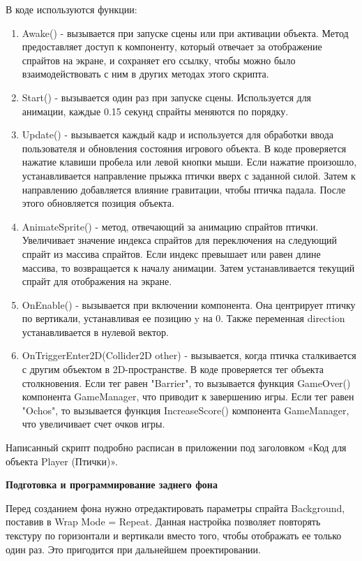 \documentclass[14pt, oneside]{altsu-report}
\begin{document}
В коде используются функции:

\begin{enumerate}
\item Awake() - вызывается при запуске сцены или при активации объекта. Метод предоставляет доступ к компоненту, который отвечает за отображение спрайтов на экране, и сохраняет его ссылку, чтобы можно было взаимодействовать с ним в других методах этого скрипта.
\item Start() - вызывается один раз при запуске сцены. Используется для анимации, каждые 0.15 секунд спрайты меняются по порядку.
\item Update() - вызывается каждый кадр и используется для обработки ввода пользователя и обновления состояния игрового объекта. В коде проверяется нажатие клавиши пробела или левой кнопки мыши. Если нажатие произошло, устанавливается направление прыжка птички вверх с заданной силой. Затем к направлению добавляется влияние гравитации, чтобы птичка падала. После этого обновляется позиция объекта.
\item AnimateSprite() - метод, отвечающий за анимацию спрайтов птички. Увеличивает значение индекса спрайтов для переключения на следующий спрайт из массива спрайтов. Если индекс превышает или равен длине массива, то возвращается к началу анимации. Затем устанавливается текущий спрайт для отображения на экране.
\item OnEnable() - вызывается при включении компонента. Она центрирует птичку по вертикали, устанавливая ее позицию y на 0. Также переменная direction устанавливается в нулевой вектор.
\item OnTriggerEnter2D(Collider2D other) - вызывается, когда птичка сталкивается с другим объектом в 2D-пространстве. В коде проверяется тег объекта столкновения. Если тег равен "Barrier", то вызывается функция GameOver() компонента GameManager, что приводит к завершению игры. Если тег равен "Ochos", то вызывается функция IncreaseScore() компонента GameManager, что увеличивает счет очков игры.
\end{enumerate} 

Написанный скрипт подробно расписан в приложении под заголовком «Код для объекта Player (Птички)».

\textbf{Подготовка и программирование заднего фона}

Перед созданием фона нужно отредактировать параметры спрайта Background, поставив в Wrap Mode = Repeat. Данная настройка позволяет повторять текстуру по горизонтали и вертикали вместо того, чтобы отображать ее только один раз. Это пригодится при дальнейшем проектировании.
\end{document}
